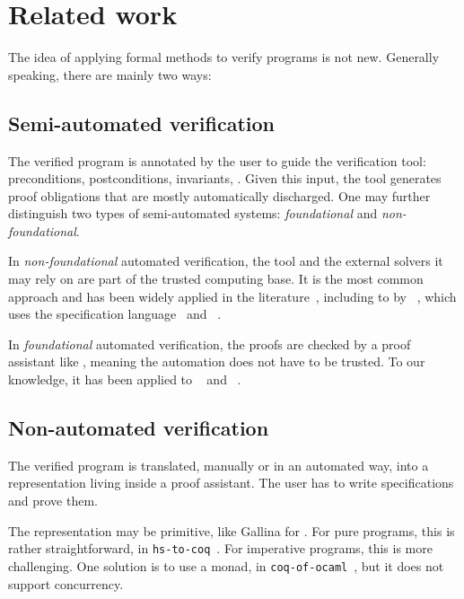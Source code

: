 \section{Related work}
\label{sec:related}

The idea of applying formal methods to verify \OCaml programs is not new.
Generally speaking, there are mainly two ways:

\subsection{Semi-automated verification}

The verified program is annotated by the user to guide the verification tool: preconditions, postconditions, invariants, \etc.
Given this input, the tool generates proof obligations that are mostly automatically discharged.
One may further distinguish two types of semi-automated systems: \emph{foundational} and \emph{non-foundational}.

In \emph{non-foundational} automated verification, the tool and the external solvers it may rely on are part of the trusted computing base.
It is the most common approach and has been widely applied in the literature~\cite{DBLP:journals/jfp/SwamyCFSBY13, DBLP:series/natosec/0001SS17, DBLP:conf/nfm/JacobsSPVPP11, DBLP:conf/icfem/DenisJM22, DBLP:conf/nfm/AstrauskasBFGMM22, DBLP:conf/esop/FilliatreP13, DBLP:journals/pacmpl/LattuadaHCBSZHPH23, DBLP:journals/pacmpl/PulteMSMSK23}, including to \OCaml by \Cameleer~\cite{DBLP:conf/cav/PereiraR20}, which uses the \Gospel specification language~\cite{DBLP:conf/fm/ChargueraudFLP19} and \WhyThree~\cite{DBLP:conf/esop/FilliatreP13}.

In \emph{foundational} automated verification, the proofs are checked by a proof assistant like \Rocq, meaning the automation does not have to be trusted.
To our knowledge, it has been applied to \C~\cite{DBLP:conf/pldi/SammlerLKMD021} and \Rust~\cite{DBLP:journals/pacmpl/GaherSJKD24}.

\subsection{Non-automated verification}

The verified program is translated, manually or in an automated way, into a representation living inside a proof assistant.
The user has to write specifications and prove them.

The representation may be primitive, like Gallina for \Rocq.
For pure programs, this is rather straightforward, \eg in \texttt{hs-to-coq}~\cite{DBLP:conf/cpp/Spector-Zabusky18}.
For imperative programs, this is more challenging.
One solution is to use a monad, \eg in \texttt{coq-of-ocaml}~\cite{coq-of-ocaml}, but it does not support concurrency.

